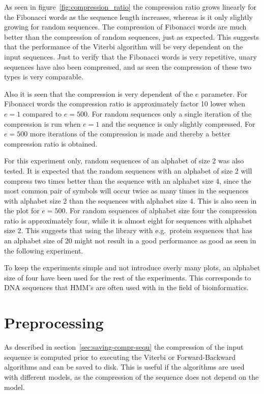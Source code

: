 As seen in figure~\ref{fig:compression_ratio} the compression ratio grows
linearly for the Fibonacci words as the sequence length increases, whereas is
it only slightly growing for random sequences. The compression of Fibonacci
words are much better than the compression of random sequences, just as
expected. This suggests that the performance of the Viterbi algorithm will be
very dependent on the input sequences. Just to verify that the Fibonacci words
is very repetitive, unary sequences have also been compressed, and as seen the
compression of these two types is very comparable.

Also it is seen that the compression is very dependent of the $e$ parameter.
For Fibonacci words the compression ratio is approximately factor 10 lower when
$e = 1$ compared to $e = 500$. For random sequences only a single iteration of
the compression is run when $e = 1$ and the sequence is only slightly
compressed. For $e = 500$ more iterations of the compression is made and
thereby a better compression ratio is obtained.

For this experiment only, random sequences of an alphabet of size 2 was also
tested. It is expected that the random sequences with an alphabet of size 2
will compress two times better than the sequence with an alphabet size 4, since
the most common pair of symbols will occur twice as many times in the sequences
with alphabet size 2 than the sequences with alphabet size 4. This is also seen
in the plot for $e = 500$. For random sequences of alphabet size four the compression ratio
is approximately four, while it is almost eight for sequences with alphabet
size 2. This suggests that using the library with e.g.\ protein sequences that
has an alphabet size of 20 might not result in a good performance as good as seen
in the following experiment.

To keep the experiments simple and not introduce overly many plots, an alphabet
size of four have been used for the rest of the experiments. This corresponds
to DNA sequences that HMM's are often used with in the field of bioinformatics.

\section{Preprocessing}

As described in section~\ref{sec:saving-compr-sequ} the compression of the
input sequence is computed prior to executing the Viterbi or Forward-Backward
algorithms and can be saved to disk. This is useful if the algorithms are used with different
models, as the compression of the sequence does not depend on the model.


